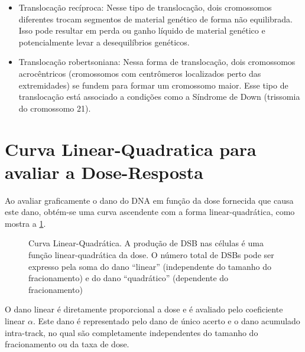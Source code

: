 \documentclass[11pt,a4paper]{article}
\begin{document}
	\begin{itemize}
		\item Translocação recíproca: Nesse tipo de translocação, dois cromossomos diferentes trocam segmentos de material genético de forma não equilibrada. Isso pode resultar em perda ou ganho líquido de material genético e potencialmente levar a desequilíbrios genéticos.
		\item Translocação robertsoniana: Nessa forma de translocação, dois cromossomos acrocêntricos (cromossomos com centrômeros localizados perto das extremidades) se fundem para formar um cromossomo maior. Esse tipo de translocação está associado a condições como a Síndrome de Down (trissomia do cromossomo 21).
	\end{itemize}


\section{Curva Linear-Quadratica para avaliar a Dose-Resposta}

	Ao avaliar graficamente o dano do DNA em função da dose fornecida que causa este dano, obtém-se uma curva ascendente com a forma linear-quadrática, como mostra a \ref{fig:DbsLinearQuadratico}.

	\begin{figure}[h]
		\centering
		\caption{Curva Linear-Quadrática. A produção de DSB nas células é uma função linear-quadrática da dose. O número total de DSBs pode ser expresso pela soma do dano ``linear'' (independente do tamanho do fracionamento) e do dano ``quadrático'' (dependente do fracionamento)}
		\label{fig:DbsLinearQuadratico}
	\end{figure}

	O dano linear é diretamente proporcional a dose e é avaliado pelo coeficiente linear $\alpha$. Este dano é representado pelo dano de único acerto e o dano acumulado intra-track, no qual são completamente independentes do tamanho do fracionamento ou da taxa de dose. 
\end{document}
